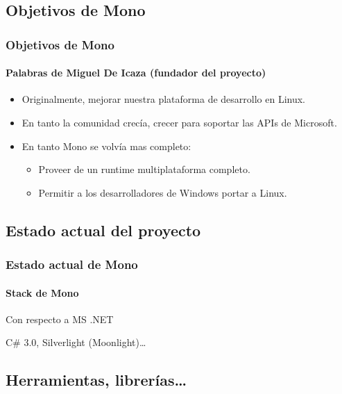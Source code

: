 \documentclass{beamer}
\begin{document}
\subsection{Objetivos de Mono}

\begin{frame}
  \frametitle{Objetivos de Mono}
  \framesubtitle{Palabras de Miguel De Icaza (fundador del proyecto)}

  \begin{itemize}
    \item Originalmente, mejorar nuestra plataforma de desarrollo en Linux.
    \item En tanto la comunidad crecía, crecer para soportar las APIs de Microsoft.

    \item En tanto Mono se volvía mas completo:
      \begin{itemize}
        \item Proveer de un runtime multiplataforma completo.
        \item Permitir a los desarrolladores de Windows portar a Linux.
      \end{itemize}
  \end{itemize}
\end{frame}


\subsection{Estado actual del proyecto}

\begin{frame}[plain]
  \frametitle{Estado actual de Mono}
  \framesubtitle{Stack de Mono}

  \begin{centering}
  \end{centering}
\end{frame}

\begin{frame}[plain]{Con respecto a MS .NET}
  \begin{centering}
  \end{centering}

  \vspace{2ex}
  C\# 3.0, Silverlight (Moonlight)\ldots
\end{frame}


\subsection{Herramientas, librerías\ldots}
\end{document}
